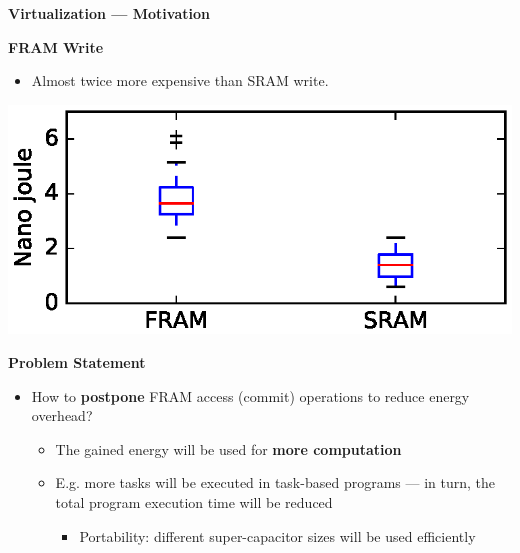





{
}


\begin{frame}{\textbf{Virtualization --- Motivation}}
	\begin{alertblock}{\textbf{FRAM Write}}
		\begin{itemize}
			\item Almost twice more expensive than SRAM write.
		\end{itemize}	
	\end{alertblock}	
	
	\centering
	\includegraphics[scale=0.5]{images/fram_write.eps}
	
	
	\begin{block}{\textbf{Problem Statement}}
		\begin{itemize}
			\item How to \textbf{postpone} FRAM access (commit) operations to reduce energy overhead? 	
			\begin{itemize}
				\item The gained energy will be used for \textbf{more computation} 
				\item E.g. more tasks will be executed in task-based programs --- in turn, the total program execution time will be reduced	
				\begin{itemize}
					\item Portability: different super-capacitor sizes will be used efficiently	
				\end{itemize}
			\end{itemize}		
		\end{itemize}	
	\end{block}
	
\end{frame}

